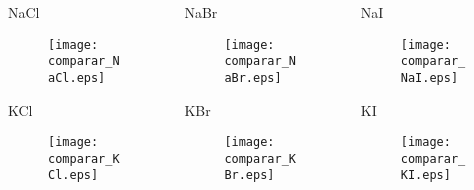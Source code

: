 \documentclass{beamer}
\begin{document}
\begin{frame}
\begin{columns}
\begin{column}{4cm}
	\begin{block}{NaCl}
    \begin{figure}
     \texttt{[image: comparar\_NaCl.eps]}
     \end{figure}
	\end{block}
	\begin{block}{KCl}
    \begin{figure}
     \texttt{[image: comparar\_KCl.eps]}
     \end{figure}
	\end{block}
\end{column}
\begin{column}{4cm}
	\begin{block}{NaBr}
    \begin{figure}
     \texttt{[image: comparar\_NaBr.eps]}
     \end{figure}
	\end{block}
	\begin{block}{KBr}
    \begin{figure}
     \texttt{[image: comparar\_KBr.eps]}
     \end{figure}
	\end{block}
\end{column}
\begin{column}{4cm}
	\begin{block}{NaI}
    \begin{figure}
	    \texttt{[image: comparar\_NaI.eps]}
     \end{figure}
	\end{block}
	\begin{block}{KI}
    \begin{figure}
     \texttt{[image: comparar\_KI.eps]}
     \end{figure}
	\end{block}
\end{column}
\end{columns}
\end{frame}
\end{document}
